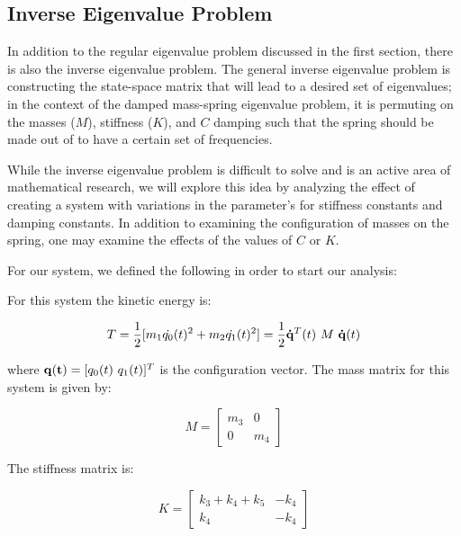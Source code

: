 \documentclass[10pt,a4paper]{article}
\begin{document}
\begin{multicols*}{2}
\section*{Inverse Eigenvalue Problem}

In addition to the regular eigenvalue problem discussed in the first section, there is also the inverse eigenvalue problem. The general inverse eigenvalue problem is constructing the state-space matrix \cite{cheever_swarthmore_college} that will lead to a desired set of eigenvalues; in the context of the damped mass-spring eigenvalue problem, it is permuting on the masses ($M$), stiffness ($K$), and $C$ damping such that the spring should be made out of to have a certain set of frequencies. 

While the inverse eigenvalue problem is difficult to solve and is an active area of mathematical research, we will explore this idea by analyzing the effect of creating a system with variations in the parameter's for stiffness constants and damping constants. In addition to examining the configuration of masses on the spring, one may examine the effects of the values of $C$ or $K$.

For our system, we defined the following in order to start our analysis:


For this system the kinetic energy is:

\begin{equation}
T = \frac{1}{2}[m_1\dot{q_0}(t)^2 + m_2\dot{q_1}(t)^2] = \frac{1}{2}{\bf \dot{q}}^T(t)\ M \ {\bf \dot{q}}(t)
\end{equation} \cite{vandiver_2011}

where ${\bf q(t)} = [q_0(t) \  q_1(t)]^T$ is the configuration vector. The mass matrix for this system is given by:

\begin{equation}
M = 
\begin{bmatrix} 
        m_3 & 0 \\
        0 & m_4
\end{bmatrix}
\end{equation}  

The stiffness matrix is:

\begin{equation}
K = 
\begin{bmatrix} 
        k_3 +k_4 + k_5 & -k_4\\
        k_4 & -k_4
\end{bmatrix}
\end{equation}


\end{multicols*}
\end{document}
